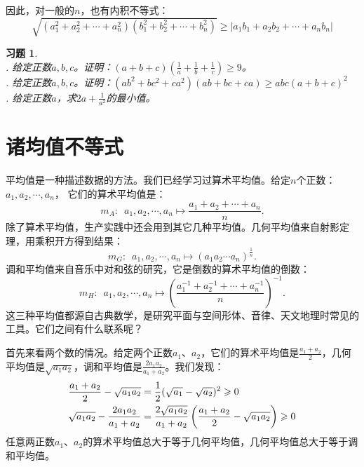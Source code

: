 \documentclass[12pt,UTF8]{ctexbook}
\newtheorem{xt}{习题}[section]
\begin{document}
因此，对一般的$n$，也有内积不等式：
$$ \sqrt{(a_1^2 + a_2^2 + \cdots + a_n^2)(b_1^2 + b_2^2 + \cdots + b_n^2)} \geqslant |a_1b_1 + a_2b_2+ \cdots + a_nb_n|$$

\begin{xt}    
    \mbox{}\\
    . 给定正数$a,b,c$。证明：$(a + b + c)(\frac{1}{a}+\frac{1}{b}+\frac{1}{c}) \geqslant 9$。\\
    . 给定正数$a,b,c$。证明：$(ab^2 + bc^2 + ca^2)(ab + bc + ca) \geqslant abc(a+b+c)^2$ \\
    . 给定正数$a$，求$2a + \frac{1}{a^2}$的最小值。
\end{xt}

\section{诸均值不等式}

平均值是一种描述数据的方法。我们已经学习过算术平均值。给定$n$个正数：$a_1, a_2, \cdots , a_n$，
它们的算术平均值是：
$$ m_A : \,\,\, a_1, a_2, \cdots , a_n \mapsto \frac{a_1 + a_2 + \cdots + a_n}{n}. $$
除了算术平均值，生产实践中还会用到其它几种平均值。几何平均值来自射影定理，用乘积开方得到结果：
$$ m_G :\,\,\, a_1, a_2, \cdots , a_n \mapsto  (a_1a_2\cdots a_n)^{\frac{1}{n}}.$$
调和平均值来自音乐中对和弦的研究，它是倒数的算术平均值的倒数：
$$ m_H : \,\,\, a_1, a_2, \cdots , a_n \mapsto \left(\frac{a_1^{-1} + a_2^{-1} + \cdots + a_n^{-1}}{n}\right)^{-1}. $$
这三种平均值都源自古典数学，是研究平面与空间形体、音律、天文地理时常见的工具。它们之间有什么联系呢？

首先来看两个数的情况。给定两个正数$a_1$、$a_2$，它们的算术平均值是$\frac{a_1 + a_2}{2}$，几何平均值是$\sqrt{a_1a_2}$，调和平均值是$\frac{2a_1a_2}{a_1 + a_2}$。我们发现：
\begin{align}
    \frac{a_1 + a_2}{2} - \sqrt{a_1a_2} &= \frac{1}{2}(\sqrt{a_1} - \sqrt{a_2})^2 \geqslant 0 \notag \\
    \sqrt{a_1a_2} - \frac{2a_1a_2}{a_1 + a_2} &= \frac{2\sqrt{a_1a_2}}{a_1 + a_2}\left(\frac{a_1 + a_2}{2} - \sqrt{a_1a_2}\right) \geqslant 0 \notag
\end{align}
任意两正数$a_1$、$a_2$的算术平均值总大于等于几何平均值，几何平均值总大于等于调和平均值。
\end{document}
